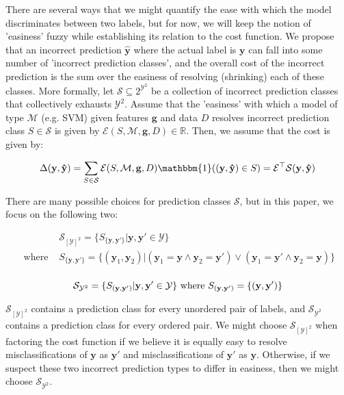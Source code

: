 \documentclass{article} %
\begin{document}
There are several ways that we might quantify 
the ease with which the model discriminates between two labels,
but for now, we will keep the notion of 'easiness' fuzzy while
establishing its relation to the cost function.
We propose that an incorrect prediction 
$\mathbf{\hat{y}}$ where the actual label is $\mathbf{y}$ can 
fall into some number of 'incorrect prediction classes', and
the overall cost of the incorrect prediction is the sum over the
easiness of resolving (shrinking) each of these classes.  More
formally, let $\mathcal{S}\subseteq 2^{\mathcal{Y}^2}$ be a 
collection of incorrect prediction classes that collectively 
exhausts $\mathcal{Y}^2$.  Assume that the 'easiness' with 
which a model of type $\mathcal{M}$ (e.g. SVM) given features 
$\mathbf{g}$ and data $D$ resolves incorrect prediction 
class $S\in\mathcal{S}$ is given by 
$\mathcal{E}(S,\mathcal{M},\mathbf{g},D)\in\mathbb{R}$.
Then, we assume that the cost is given by:

\begin{equation}
\Delta(\mathbf{y},\mathbf{\hat{y}})=\sum_{S\in\mathcal{S}}\mathcal{E}(S,\mathcal{M},\mathbf{g}, D)\mathbbm{1}((\mathbf{y},\mathbf{\hat{y}})\in S)=
\mathbf{\mathcal{E}}^\top \mathbf{\mathcal{S}}(\mathbf{y},\mathbf{\hat{y}})
\end{equation}

There are many possible choices for prediction classes $\mathcal{S}$, but
in this paper, we focus on the following two:

\begin{equation}
\begin{split}
& \mathcal{S}_{[\mathcal{Y}]^2} = \{ S_{\{\mathbf{y},\mathbf{y}'\}} | \mathbf{y},\mathbf{y}'\in\mathcal{Y}\} \\
\text{ where } & S_{\{\mathbf{y},\mathbf{y}'\}}=
\{ (\mathbf{y}_1, \mathbf{y}_2) | (\mathbf{y}_1=\mathbf{y}\wedge \mathbf{y}_2=\mathbf{y}')\vee(\mathbf{y}_1=\mathbf{y}'\wedge \mathbf{y}_2=\mathbf{y}) \} \\
\end{split}
\end{equation}

\begin{equation}
\mathcal{S}_{\mathcal{Y}^2} = \{ S_{(\mathbf{y},\mathbf{y}')} | \mathbf{y},\mathbf{y}'\in\mathcal{Y}\}\text{ where }S_{(\mathbf{y},\mathbf{y}')}=\{ (\mathbf{y},\mathbf{y}') \} \\
\end{equation}

$\mathcal{S}_{[\mathcal{Y}]^2}$ contains a prediction class for every
unordered pair of labels, and $\mathcal{S}_{\mathcal{Y}^2}$ contains
a prediction class for every ordered pair.  We might choose 
$\mathcal{S}_{[\mathcal{Y}]^2}$ when factoring the cost function if
we believe it is equally easy to resolve misclassifications of 
$\mathbf{y}$ as $\mathbf{y}'$ and misclassifications of $\mathbf{y}'$
as $\mathbf{y}$.  Otherwise, if we suspect these two incorrect 
prediction types to differ in easiness, then we might choose 
$\mathcal{S}_{\mathcal{Y}^2}$.
\end{document}
